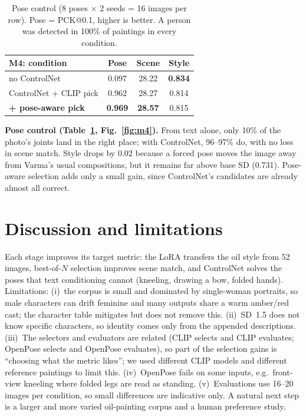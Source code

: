 \documentclass[11pt,a4paper,twocolumn]{article}
\begin{document}
\begin{table}[h]
\centering
\small
\setlength{\tabcolsep}{4pt}
\begin{tabular}{lccc}
\toprule
M4: condition & Pose & Scene & Style \\
\midrule
no ControlNet & 0.097 & 28.22 & \textbf{0.834} \\
ControlNet + CLIP pick & 0.962 & 28.27 & 0.814 \\
\textbf{+ pose-aware pick} &\textbf{0.969} & \textbf{28.57} & 0.815 \\
\bottomrule
\end{tabular}
\caption{Pose control (8 poses $\times$ 2 seeds = 16 images per row). Pose = PCK@0.1, higher is better.
A person was detected in 100\% of paintings in every condition.}
\label{tab:m4}
\end{table}

\textbf{Pose control (Table~\ref{tab:m4}, Fig.~\ref{fig:m4}).} From text alone, only 10\% of the photo's
joints land in the right place; with ControlNet, 96--97\% do, with no loss in scene match. Style drops by
0.02 because a forced pose moves the image away from Varma's usual compositions, but it remains far above
base SD (0.731). Pose-aware selection adds only a small gain, since ControlNet's candidates are already
almost all correct.

\section{Discussion and limitations}
Each stage improves its target metric: the LoRA transfers the oil style from 52 images, best-of-$N$ selection
improves scene match, and ControlNet solves the poses that text conditioning cannot (kneeling, drawing a bow,
folded hands). Limitations: (i)~the corpus is small and dominated by single-woman portraits, so male
characters can drift feminine and many outputs share a warm amber/red cast; the character table mitigates
but does not remove this. (ii)~SD~1.5 does not know specific characters, so identity comes only from the
appended descriptions. (iii)~The selectors and evaluators are related (CLIP selects and CLIP evaluates;
OpenPose selects and OpenPose evaluates), so part of the selection gains is ``choosing what the metric likes'';
we used different CLIP models and different reference paintings to limit this. (iv)~OpenPose fails on some
inputs, e.g.\ front-view kneeling where folded legs are read as standing. (v)~Evaluations use 16--20 images
per condition, so small differences are indicative only. A natural next step is a larger and more varied
oil-painting corpus and a human preference study.
\end{document}

